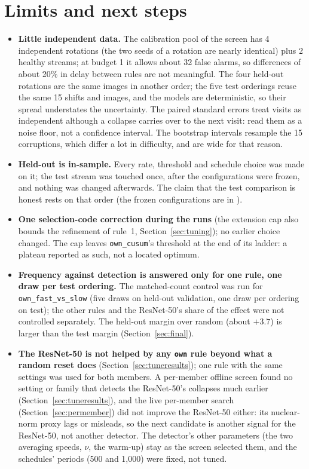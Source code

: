 \documentclass[10pt]{article}
\newcommand{\rl}[1]{\texttt{#1}}
\newcommand{\rn}{ResNet-50}
\begin{document}
\section{Limits and next steps}
\begin{itemize}
  \item \textbf{Little independent data.} The calibration pool of the screen has 4 independent rotations (the two seeds of a rotation are nearly identical) plus 2 healthy streams; at budget 1 it allows about 32 false alarms, so differences of about 20\% in delay between rules are not meaningful. The four held-out rotations are the same images in another order; the five test orderings reuse the same 15 shifts and images, and the models are deterministic, so their spread understates the uncertainty. The paired standard errors treat visits as independent although a collapse carries over to the next visit: read them as a noise floor, not a confidence interval. The bootstrap intervals resample the 15 corruptions, which differ a lot in difficulty, and are wide for that reason.
  \item \textbf{Held-out is in-sample.} Every rate, threshold and schedule choice was made on it; the test stream was touched once, after the configurations were frozen, and nothing was changed afterwards. The claim that the test comparison is honest rests on that order (the frozen configurations are in ).
  \item \textbf{One selection-code correction during the runs} (the extension cap also bounds the refinement of rule~1, Section~\ref{sec:tuning}); no earlier choice changed. The cap leaves \rl{own\_cusum}'s threshold at the end of its ladder: a plateau reported as such, not a located optimum.
  \item \textbf{Frequency against detection is answered only for one rule, one draw per test ordering.} The matched-count control was run for \rl{own\_fast\_vs\_slow} (five draws on held-out validation, one draw per ordering on test); the other rules and the \rn{}'s share of the effect were not controlled separately. The held-out margin over random (about $+3.7$) is larger than the test margin (Section~\ref{sec:final}).
  \item \textbf{The \rn{} is not helped by any \rl{own} rule beyond what a random reset does} (Section~\ref{sec:tuneresults}); one rule with the same settings was used for both members. A per-member offline screen found no setting or family that detects the \rn{}'s collapses much earlier (Section~\ref{sec:tuneresults}), and the live per-member search (Section~\ref{sec:permember}) did not improve the \rn{} either: its nuclear-norm proxy lags or misleads, so the next candidate is another signal for the \rn{}, not another detector. The detector's other parameters (the two averaging speeds, $\nu$, the warm-up) stay as the screen selected them, and the schedules' periods (500 and 1,000) were fixed, not tuned.

\end{itemize}
\end{document}
